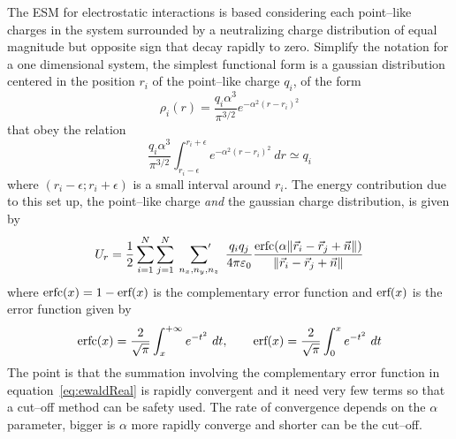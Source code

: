 The \ac{ESM} for electrostatic interactions is based considering each point--like charges in the system surrounded by a neutralizing charge distribution of equal magnitude but opposite sign that decay rapidly to zero. Simplify the notation for a one dimensional system, the simplest functional form is a gaussian distribution centered in the position $r_i$ of the point--like charge $q_i$, of the form
\begin{equation}
	\rho_i(r) = \frac{q_i\alpha^3}{\pi^{3/2}}e^{-\alpha^2 (r - r_i)^2}
\end{equation}
that obey the relation
\begin{equation*}
	\frac{q_i\alpha^3}{\pi^{3/2}}\int_{r_i-\epsilon}^{r_i+\epsilon}e^{-\alpha^2 (r - r_i)^2}\ dr \simeq q_i
\end{equation*}
where $(r_i-\epsilon; r_i+\epsilon)$ is a small interval around $r_i$. The energy contribution due to this set up, the point--like charge \textit{and} the gaussian charge distribution, is given by
\begin{equation}
	U_r = \frac{1}{2}\sum_{i=1}^N\sum_{j=1}^N\ \sideset{}{'}\sum_{n_x,n_y,n_z}\ \frac{q_iq_j}{4 \pi \varepsilon_0} \frac{\erfc{(\alpha \| \vec r_i - \vec r_j + \vec n \|)}}{\| \vec r_i - \vec r_j + \vec n \|}
	\label{eq:ewaldReal}
\end{equation}
where $\text{erfc}(x) = 1-\text{erf}(x)$ is the complementary error function and $\text{erf}(x)$ is the error function given by
\begin{equation}
	\text{erfc}(x) = \frac{2}{\sqrt{\pi}}\int_{x}^{+\infty} e^{-t^2}\ dt, \qquad \text{erf}(x) = \frac{2}{\sqrt{\pi}}\int_{0}^{x} e^{-t^2}\ dt
	\label{eq:erf}
\end{equation}
The point is that the summation involving the complementary error function in equation~\eqref{eq:ewaldReal} is rapidly convergent and it need very few terms so that a cut--off method can be safety used. The rate of convergence depends on the $\alpha$ parameter, bigger is $\alpha$ more rapidly converge and shorter can be the cut--off.


